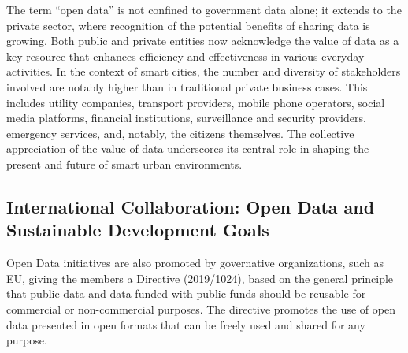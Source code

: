The term ``open data'' is not confined to government data alone; it extends to the private sector, where recognition of the potential benefits of sharing data is growing. Both public and private entities now acknowledge the value of data as a key resource that enhances efficiency and effectiveness in various everyday activities. In the context of smart cities, the number and diversity of stakeholders involved are notably higher than in traditional private business cases. This includes utility companies, transport providers, mobile phone operators, social media platforms, financial institutions, surveillance and security providers, emergency services, and, notably, the citizens themselves. The collective appreciation of the value of data underscores its central role in shaping the present and future of smart urban environments.

\subsection{International Collaboration: Open Data and Sustainable Development Goals}
Open Data initiatives are also promoted by governative organizations, such as EU, giving the members a Directive (2019/1024)\cite{EU2019Directive}, based on the general principle that public data and data funded with public funds should be reusable for commercial or non-commercial purposes. The directive promotes the use of open data presented in open formats that can be freely used and shared for any purpose.

